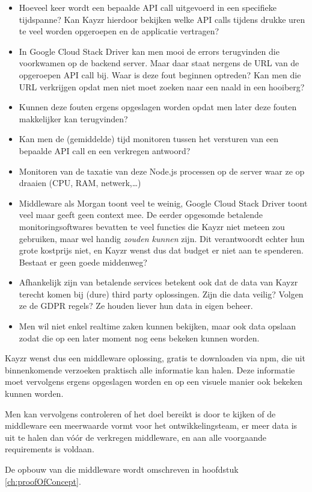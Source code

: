 \begin{itemize}
	\item Hoeveel keer wordt een bepaalde API call uitgevoerd in een specifieke tijdspanne? Kan Kayzr hierdoor bekijken welke API calls tijdens drukke uren te veel worden opgeroepen en de applicatie vertragen?
	\item In Google Cloud Stack Driver kan men mooi de errors terugvinden die voorkwamen op de backend server. Maar daar staat nergens de URL van de opgeroepen API call bij. Waar is deze fout beginnen optreden? Kan men die URL verkrijgen opdat men niet moet zoeken naar een naald in een hooiberg?
	\item Kunnen deze fouten ergens opgeslagen worden opdat men later deze fouten makkelijker kan terugvinden?
	\item Kan men de (gemiddelde) tijd monitoren tussen het versturen van een bepaalde API call en een verkregen antwoord?
	\item Monitoren van de taxatie van deze Node.js processen op de server waar ze op draaien (CPU, RAM, netwerk,…)
	\item Middleware als Morgan toont veel te weinig, Google Cloud Stack Driver toont veel maar geeft geen context mee. De eerder opgesomde betalende monitoringsoftwares bevatten te veel functies die Kayzr niet meteen zou gebruiken, maar wel handig \textit{zouden kunnen} zijn. Dit verantwoordt echter hun grote kostprijs niet, en Kayzr wenst dus dat budget er niet aan te spenderen. Bestaat er geen goede middenweg?
	\item Afhankelijk zijn van betalende services betekent ook dat de data van Kayzr terecht komen bij (dure) third party oplossingen. Zijn die data veilig? Volgen ze de GDPR regels? Ze houden liever hun data in eigen beheer.
	\item Men wil niet enkel realtime zaken kunnen bekijken, maar ook data opslaan zodat die op een later moment nog eens bekeken kunnen worden.
\end{itemize}

Kayzr wenst dus een middleware oplossing, gratis te downloaden via npm, die uit binnenkomende verzoeken praktisch alle informatie kan halen. Deze informatie moet vervolgens ergens opgeslagen worden en op een visuele manier ook bekeken kunnen worden. 

Men kan vervolgens controleren of het doel bereikt is door te kijken of de middleware een meerwaarde vormt voor het ontwikkelingsteam, er meer data is uit te halen dan vóór de verkregen middleware, en aan alle voorgaande requirements is voldaan.

De opbouw van die middleware wordt omschreven in hoofdstuk \ref{ch:proofOfConcept}.